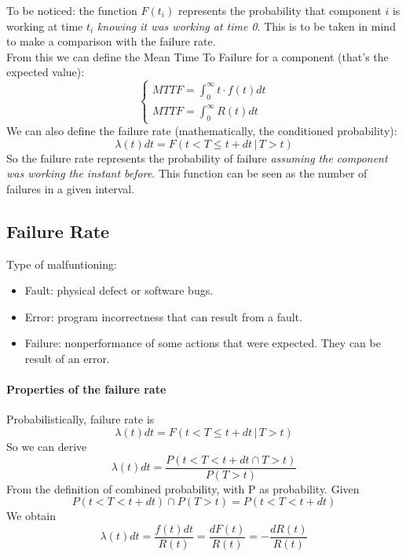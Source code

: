 \documentclass[10pt,a4paper]{article}
\begin{document}
			To be noticed: the function $F(t_i)$ represents the probability that component $i$ is working at time $t_i$ \emph{knowing it was working at time 0}. This is to be taken in mind to make a comparison with the failure rate.\\
			From this we can define the Mean Time To Failure for a component (that's the expected value):
			\begin{equation}
				\begin{cases}
					MTTF = \int_0^{\infty}t \cdot f(t)dt\\
					MTTF = \int_0^{\infty}R(t)dt
				\end{cases}
			\end{equation}
			We can also define the failure rate (mathematically, the conditioned probability):
			\begin{equation}
				\lambda(t)dt = F(t < T \leq t+dt \,\vert\, T > t)
			\end{equation}
			So the failure rate represents the probability of failure \emph{assuming the component was working the instant before}. This function can be seen as the number of failures in a given interval.
			
			\subsection{Failure Rate}
				Type of malfuntioning:
				\begin{itemize}
					\item Fault: physical defect or software bugs.
					\item Error: program incorrectness that can result from a fault.
					\item Failure: nonperformance of some actions that were expected. They can be result of an error.
				\end{itemize}
				
				\paragraph{Properties of the failure rate}
					Probabilistically, failure rate is
					\begin{equation}
						\lambda(t)dt = F(t < T \leq t+dt \,\vert\, T > t)
					\end{equation}
					So we can derive
					\begin{equation}
						\lambda(t)dt = \frac{P(t < T < t + dt \cap T > t)}{P(T > t)}
					\end{equation}
					From the definition of combined probability, with P as probability. Given
					\begin{equation}
						P(t < T < t+dt) \cap P(T > t) = P(t < T < t+dt)
					\end{equation}
					We obtain
					\begin{equation}
						\lambda(t)dt = \frac{f(t)dt}{R(t)} = \frac{dF(t)}{R(t)} = -\frac{dR(t)}{R(t)}
					\end{equation}
				
\end{document}
